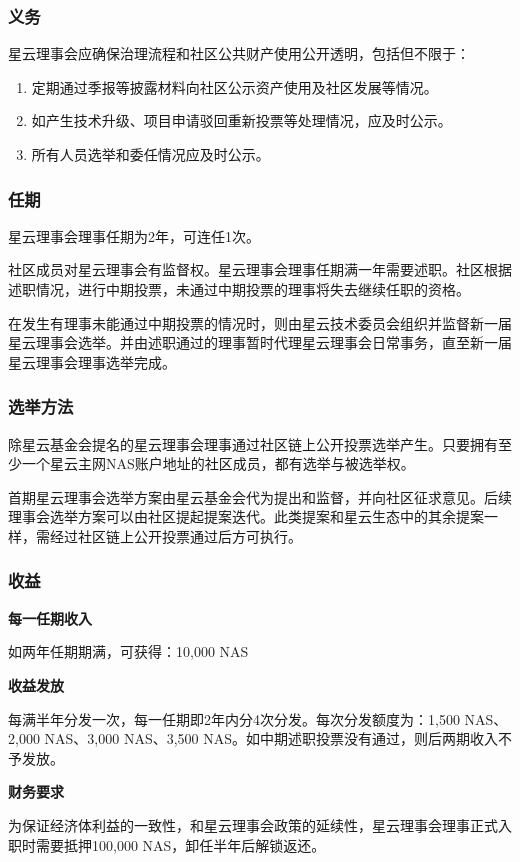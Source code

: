 \subsubsection{义务}
星云理事会应确保治理流程和社区公共财产使用公开透明，包括但不限于：
\begin{enumerate}
	\item 定期通过季报等披露材料向社区公示资产使用及社区发展等情况。
	\item 如产生技术升级、项目申请驳回重新投票等处理情况，应及时公示。
	\item 所有人员选举和委任情况应及时公示。
\end{enumerate}

\subsubsection{任期}
星云理事会理事任期为2年，可连任1次。

社区成员对星云理事会有监督权。星云理事会理事任期满一年需要述职。社区根据述职情况，进行中期投票，未通过中期投票的理事将失去继续任职的资格。

在发生有理事未能通过中期投票的情况时，则由星云技术委员会组织并监督新一届星云理事会选举。并由述职通过的理事暂时代理星云理事会日常事务，直至新一届星云理事会理事选举完成。

\subsubsection{选举方法}
除星云基金会提名的星云理事会理事通过社区链上公开投票选举产生。只要拥有至少一个星云主网NAS账户地址的社区成员，都有选举与被选举权。

首期星云理事会选举方案由星云基金会代为提出和监督，并向社区征求意见。后续理事会选举方案可以由社区提起提案迭代。此类提案和星云生态中的其余提案一样，需经过社区链上公开投票通过后方可执行。


\subsubsection{收益}
\textbf{每一任期收入}

如两年任期期满，可获得：10,000 NAS

\textbf{收益发放}

每满半年分发一次，每一任期即2年内分4次分发。每次分发额度为：1,500 NAS、2,000 NAS、3,000 NAS、3,500 NAS。如中期述职投票没有通过，则后两期收入不予发放。

\textbf{财务要求}

为保证经济体利益的一致性，和星云理事会政策的延续性，星云理事会理事正式入职时需要抵押100,000 NAS，卸任半年后解锁返还。


